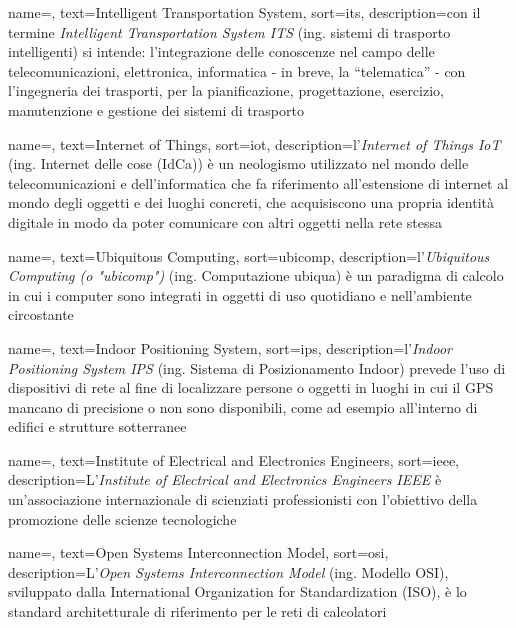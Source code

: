  {
    name=,
    text=Intelligent Transportation System,
    sort=its,
    description={con il termine \emph{Intelligent Transportation System ITS} (ing. sistemi di trasporto intelligenti) si intende: l'integrazione delle conoscenze nel campo delle telecomunicazioni, elettronica, informatica - in breve, la “telematica” - con l'ingegneria dei trasporti, per la pianificazione, progettazione, esercizio, manutenzione e gestione dei sistemi di trasporto}
}

 {
    name=,
    text=Internet of Things,
    sort=iot,
    description={l'\emph{Internet of Things IoT} (ing. Internet delle cose (IdCa)) è un neologismo utilizzato nel mondo delle telecomunicazioni e dell'informatica che fa riferimento all'estensione di internet al mondo degli oggetti e dei luoghi concreti, che acquisiscono una propria identità digitale in modo da poter comunicare con altri oggetti nella rete stessa}
}

 {
    name=,
    text=Ubiquitous Computing,
    sort=ubicomp,
    description={l'\emph{Ubiquitous Computing (o "ubicomp")} (ing. Computazione ubiqua) è un paradigma di calcolo in cui i computer sono integrati in oggetti di uso quotidiano e nell'ambiente circostante}
}

 {
    name=,
    text=Indoor Positioning System,
    sort=ips,
    description={l'\emph{Indoor Positioning System IPS} (ing. Sistema di Posizionamento Indoor) prevede l'uso di dispositivi di rete al fine di localizzare persone o oggetti in luoghi in cui il GPS mancano di precisione o non sono disponibili, come ad esempio all'interno di edifici e strutture sotterranee}
}

 {
    name=,
    text=Institute of Electrical and Electronics Engineers,
    sort=ieee,
    description={L'\emph{Institute of Electrical and Electronics Engineers IEEE} è un'associazione internazionale di scienziati professionisti con l'obiettivo della promozione delle scienze tecnologiche}
}

 {
    name=,
    text=Open Systems Interconnection Model,
    sort=osi,
    description={L'\emph{Open Systems Interconnection Model} (ing. Modello OSI), sviluppato dalla International Organization for Standardization (ISO), è lo standard architetturale di riferimento per le reti di calcolatori}
}

